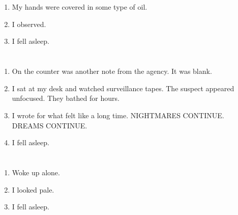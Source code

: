 \documentclass{article}
\begin{document}
    \newpage
    
    \section{}
    
    \begin{enumerate}
    
    \item My hands were covered in some type of oil.\\
    
    \item I observed.\\
    
    \item I fell asleep.\\
    
    \end{enumerate}
     
    \newpage
    
    \section{}
    
    \begin{enumerate}
    
    \item On the counter was another note from the agency. It was blank.\\
    
    \item I sat at my desk and watched surveillance tapes. The suspect appeared unfocused. They bathed for hours.\\
    
    \item I wrote for what felt like a long time. NIGHTMARES CONTINUE. DREAMS CONTINUE.\\
    
    \item I fell asleep.\\
    
    \end{enumerate}
     
    \newpage
    
    \section{}
    
    \begin{enumerate}
    
    \item Woke up alone.\\
    
    \item I looked pale.\\
    
    \item I fell asleep.\\
    
    \end{enumerate}
     
\end{document}

